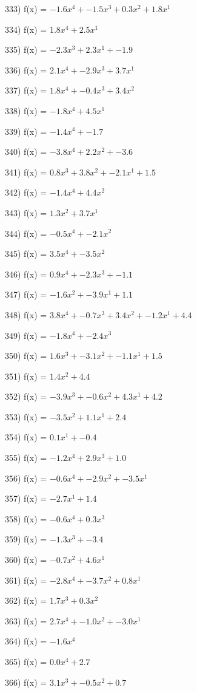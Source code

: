 \documentclass[10pt,a4paper]{article}
\begin{document}
333) f(x) = $-1.6x^4 + -1.5x^3 + 0.3x^2 + 1.8x^1$

334) f(x) = $1.8x^4 + 2.5x^1$

335) f(x) = $-2.3x^3 + 2.3x^1 + -1.9$

336) f(x) = $2.1x^4 + -2.9x^3 + 3.7x^1$

337) f(x) = $1.8x^4 + -0.4x^3 + 3.4x^2$

338) f(x) = $-1.8x^4 + 4.5x^1$

339) f(x) = $-1.4x^4 + -1.7$

340) f(x) = $-3.8x^4 + 2.2x^2 + -3.6$

341) f(x) = $0.8x^3 + 3.8x^2 + -2.1x^1 + 1.5$

342) f(x) = $-1.4x^4 + 4.4x^2$

343) f(x) = $1.3x^2 + 3.7x^1$

344) f(x) = $-0.5x^4 + -2.1x^2$

345) f(x) = $3.5x^4 + -3.5x^2$

346) f(x) = $0.9x^4 + -2.3x^3 + -1.1$

347) f(x) = $-1.6x^2 + -3.9x^1 + 1.1$

348) f(x) = $3.8x^4 + -0.7x^3 + 3.4x^2 + -1.2x^1 + 4.4$

349) f(x) = $-1.8x^4 + -2.4x^3$

350) f(x) = $1.6x^3 + -3.1x^2 + -1.1x^1 + 1.5$

351) f(x) = $1.4x^2 + 4.4$

352) f(x) = $-3.9x^3 + -0.6x^2 + 4.3x^1 + 4.2$

353) f(x) = $-3.5x^2 + 1.1x^1 + 2.4$

354) f(x) = $0.1x^1 + -0.4$

355) f(x) = $-1.2x^4 + 2.9x^3 + 1.0$

356) f(x) = $-0.6x^4 + -2.9x^2 + -3.5x^1$

357) f(x) = $-2.7x^1 + 1.4$

358) f(x) = $-0.6x^4 + 0.3x^3$

359) f(x) = $-1.3x^3 + -3.4$

360) f(x) = $-0.7x^2 + 4.6x^1$

361) f(x) = $-2.8x^4 + -3.7x^2 + 0.8x^1$

362) f(x) = $1.7x^3 + 0.3x^2$

363) f(x) = $2.7x^4 + -1.0x^2 + -3.0x^1$

364) f(x) = $-1.6x^4$

365) f(x) = $0.0x^4 + 2.7$

366) f(x) = $3.1x^3 + -0.5x^2 + 0.7$
\end{document}
